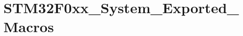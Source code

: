 \hypertarget{group___s_t_m32_f0xx___system___exported___macros}{}\section{S\+T\+M32\+F0xx\+\_\+\+System\+\_\+\+Exported\+\_\+\+Macros}
\label{group___s_t_m32_f0xx___system___exported___macros}
